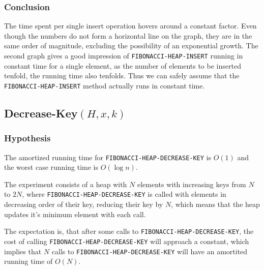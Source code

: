 \documentclass[a4paper,oneside,11pt]{article}
\begin{document}
\subsubsection*{Conclusion}
The time spent per single insert operation hovers around a constant factor. Even though the numbers do not form a horizontal line on the graph, they are in the same order of magnitude, excluding the possibility of an exponential growth. The second graph gives a good impression of \texttt{FIBONACCI-HEAP-INSERT} running in constant time for a single element, as the number of elements to be inserted tenfold, the running time also tenfolds. Thus we can safely assume that the \texttt{FIBONACCI-HEAP-INSERT} method actually runs in constant time.

\subsection*{Decrease-Key$(H,x,k)$}
\subsubsection*{Hypothesis}

The amortized running time for \texttt{FIBONACCI-HEAP-DECREASE-KEY} is $O(1)$ and the worst case running time is $O(\log n)$.

The experiment consists of a heap with $N$ elements with increasing keys from $N$ to $2N$, where \texttt{FIBONACCI-HEAP-DECREASE-KEY} is called with elements in decreasing order of their key, reducing their key by $N$, which means that the heap updates it's minimum element with each call.

The expectation is, that after some calls to \texttt{FIBONACCI-HEAP-DECREASE-KEY}, the cost of calling \texttt{FIBONACCI-HEAP-DECREASE-KEY} will approach a constant, which implies that $N$ calls to \texttt{FIBONACCI-HEAP-DECREASE-KEY} will have an amortited running time of $O(N)$.
\end{document}
